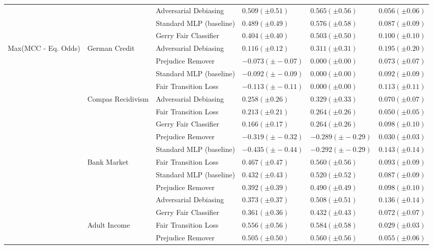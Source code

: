 \begin{tabular}{llllll}
 &  & Adversarial Debiasing & $0.509 (\pm0.51)$ & $0.565 (\pm0.56)$ & $0.056 (\pm0.06)$ \\
 &  & Standard MLP (baseline) & $0.489 (\pm0.49)$ & $0.576 (\pm0.58)$ & $0.087 (\pm0.09)$ \\
 &  & Gerry Fair Classifier & $0.404 (\pm0.40)$ & $0.503 (\pm0.50)$ & $0.100 (\pm0.10)$ \\
\cline{1-6} \cline{2-6}
\multirow[t]{19}{*}{Max(MCC - Eq. Odds)} & \multirow[t]{4}{*}{German Credit} & Adversarial Debiasing & $0.116 (\pm0.12)$ & $0.311 (\pm0.31)$ & $0.195 (\pm0.20)$ \\
 &  & Prejudice Remover & $-0.073 (\pm-0.07)$ & $0.000 (\pm0.00)$ & $0.073 (\pm0.07)$ \\
 &  & Standard MLP (baseline) & $-0.092 (\pm-0.09)$ & $0.000 (\pm0.00)$ & $0.092 (\pm0.09)$ \\
 &  & Fair Transition Loss & $-0.113 (\pm-0.11)$ & $0.000 (\pm0.00)$ & $0.113 (\pm0.11)$ \\
\cline{2-6}
 & \multirow[t]{5}{*}{Compas Recidivism} & Adversarial Debiasing & $0.258 (\pm0.26)$ & $0.329 (\pm0.33)$ & $0.070 (\pm0.07)$ \\
 &  & Fair Transition Loss & $0.213 (\pm0.21)$ & $0.264 (\pm0.26)$ & $0.050 (\pm0.05)$ \\
 &  & Gerry Fair Classifier & $0.166 (\pm0.17)$ & $0.264 (\pm0.26)$ & $0.098 (\pm0.10)$ \\
 &  & Prejudice Remover & $-0.319 (\pm-0.32)$ & $-0.289 (\pm-0.29)$ & $0.030 (\pm0.03)$ \\
 &  & Standard MLP (baseline) & $-0.435 (\pm-0.44)$ & $-0.292 (\pm-0.29)$ & $0.143 (\pm0.14)$ \\
\cline{2-6}
 & \multirow[t]{5}{*}{Bank Market} & Fair Transition Loss & $0.467 (\pm0.47)$ & $0.560 (\pm0.56)$ & $0.093 (\pm0.09)$ \\
 &  & Standard MLP (baseline) & $0.432 (\pm0.43)$ & $0.520 (\pm0.52)$ & $0.087 (\pm0.09)$ \\
 &  & Prejudice Remover & $0.392 (\pm0.39)$ & $0.490 (\pm0.49)$ & $0.098 (\pm0.10)$ \\
 &  & Adversarial Debiasing & $0.373 (\pm0.37)$ & $0.508 (\pm0.51)$ & $0.136 (\pm0.14)$ \\
 &  & Gerry Fair Classifier & $0.361 (\pm0.36)$ & $0.432 (\pm0.43)$ & $0.072 (\pm0.07)$ \\
\cline{2-6}
 & \multirow[t]{5}{*}{Adult Income} & Fair Transition Loss & $0.556 (\pm0.56)$ & $0.584 (\pm0.58)$ & $0.029 (\pm0.03)$ \\
 &  & Prejudice Remover & $0.505 (\pm0.50)$ & $0.560 (\pm0.56)$ & $0.055 (\pm0.06)$ \\

\end{tabular}

